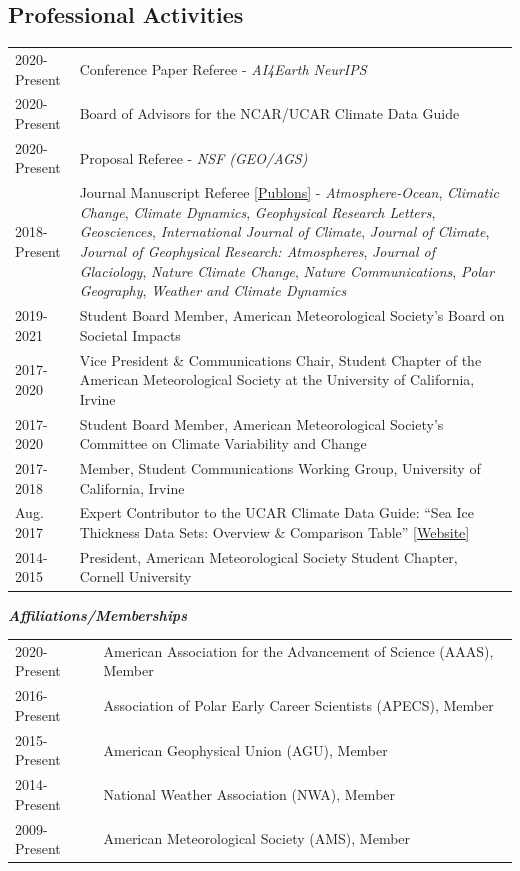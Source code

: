 \documentclass[margin,line,palatino,courier,10pt]{res}
\begin{document}
\begin{resume}
\section{\sc \textcolor{Cerulean}{\large{\textbf{Professional Activities}}}}
\vspace*{0.05in}
\begin{tabular}{@{}p{0.9in}p{4in}}
2020-Present & Conference Paper Referee - \textit{AI4Earth NeurIPS}\\
2020-Present & Board of Advisors for the NCAR/UCAR Climate Data Guide\\
2020-Present & Proposal Referee - \textit{NSF (GEO/AGS)}\\
2018-Present & Journal Manuscript Referee \href{https://publons.com/author/1521902/zachary-labe#profile}{[Publons]} - \textit{Atmosphere-Ocean}, \textit{Climatic Change}, \textit{Climate Dynamics}, \textit{Geophysical Research Letters}, \textit{Geosciences}, \textit{International Journal of Climate}, \textit{Journal of Climate}, \textit{Journal of Geophysical Research: Atmospheres}, \textit{Journal of Glaciology}, \textit{Nature Climate Change}, \textit{Nature Communications}, \textit{Polar Geography}, \textit{Weather and Climate Dynamics} \\
2019-2021& Student Board Member, American Meteorological Society's Board on Societal Impacts\\
2017-2020 & Vice President \& Communications Chair, Student Chapter of the American Meteorological Society at the University of California, Irvine\\
2017-2020 & Student Board Member, American Meteorological Society's Committee on Climate Variability and Change\\
2017-2018 & Member, Student Communications Working Group, University of California, Irvine\\
Aug. 2017 & Expert Contributor to the UCAR Climate Data Guide: ``Sea Ice Thickness Data Sets: Overview \& Comparison Table'' \href{https://climatedataguide.ucar.edu/climate-data/sea-ice-thickness-data-sets-overview-comparison-table}{[Website]}\\
2014-2015 & President, American Meteorological Society Student Chapter, Cornell University\\
\end{tabular}

\textit{\textbf{Affiliations/Memberships}}
\vspace*{0.05in}\\
\begin{tabular}{@{}p{0.9in}p{4in}}
2020-Present & American Association for the Advancement of Science (AAAS), Member\\
2016-Present & Association of Polar Early Career Scientists (APECS), Member\\ 
2015-Present & American Geophysical Union (AGU), Member\\
2014-Present & National Weather Association (NWA), Member\\
2009-Present & American Meteorological Society (AMS), Member\\
\end{tabular}

\end{resume}
\end{document}
